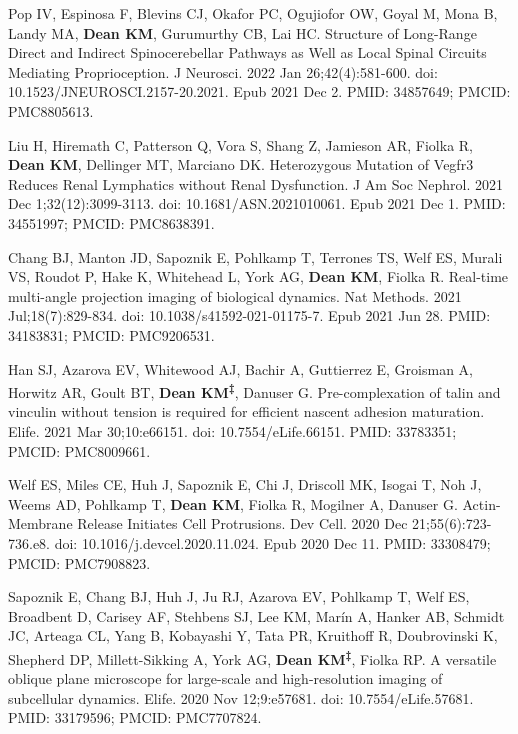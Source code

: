 \begin{etaremune}
\item Pop IV, Espinosa F, Blevins CJ, Okafor PC, Ogujiofor OW, Goyal M, Mona B, Landy MA, \textbf{Dean KM}, Gurumurthy CB, Lai HC. Structure of Long-Range Direct and Indirect Spinocerebellar Pathways as Well as Local Spinal Circuits Mediating Proprioception. J Neurosci. 2022 Jan 26;42(4):581-600. doi: 10.1523/JNEUROSCI.2157-20.2021. Epub 2021 Dec 2. PMID: 34857649; PMCID: PMC8805613.

\item Liu H, Hiremath C, Patterson Q, Vora S, Shang Z, Jamieson AR, Fiolka R, \textbf{Dean KM}, Dellinger MT, Marciano DK. Heterozygous Mutation of Vegfr3 Reduces Renal Lymphatics without Renal Dysfunction. J Am Soc Nephrol. 2021 Dec 1;32(12):3099-3113. doi: 10.1681/ASN.2021010061. Epub 2021 Dec 1. PMID: 34551997; PMCID: PMC8638391.

\item Chang BJ, Manton JD, Sapoznik E, Pohlkamp T, Terrones TS, Welf ES, Murali VS, Roudot P, Hake K, Whitehead L, York AG, \textbf{Dean KM}, Fiolka R. Real-time multi-angle projection imaging of biological dynamics. Nat Methods. 2021 Jul;18(7):829-834. doi: 10.1038/s41592-021-01175-7. Epub 2021 Jun 28. PMID: 34183831; PMCID: PMC9206531.

\item Han SJ, Azarova EV, Whitewood AJ, Bachir A, Guttierrez E, Groisman A, Horwitz AR, Goult BT, \textbf{Dean KM\textsuperscript{‡}}, Danuser G. Pre-complexation of talin and vinculin without tension is required for efficient nascent adhesion maturation. Elife. 2021 Mar 30;10:e66151. doi: 10.7554/eLife.66151. PMID: 33783351; PMCID: PMC8009661.

\item Welf ES, Miles CE, Huh J, Sapoznik E, Chi J, Driscoll MK, Isogai T, Noh J, Weems AD, Pohlkamp T, \textbf{Dean KM}, Fiolka R, Mogilner A, Danuser G. Actin-Membrane Release Initiates Cell Protrusions. Dev Cell. 2020 Dec 21;55(6):723-736.e8. doi: 10.1016/j.devcel.2020.11.024. Epub 2020 Dec 11. PMID: 33308479; PMCID: PMC7908823.

\item  Sapoznik E, Chang BJ, Huh J, Ju RJ, Azarova EV, Pohlkamp T, Welf ES, Broadbent D, Carisey AF, Stehbens SJ, Lee KM, Marín A, Hanker AB, Schmidt JC, Arteaga CL, Yang B, Kobayashi Y, Tata PR, Kruithoff R, Doubrovinski K, Shepherd DP, Millett-Sikking A, York AG, \textbf{Dean KM\textsuperscript{‡}}, Fiolka RP. A versatile oblique plane microscope for large-scale and high-resolution imaging of subcellular dynamics. Elife. 2020 Nov 12;9:e57681. doi: 10.7554/eLife.57681. PMID: 33179596; PMCID: PMC7707824.


\end{etaremune}
